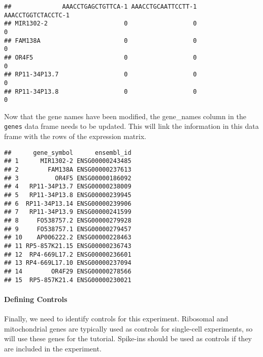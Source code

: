 \documentclass[]{article}
\newenvironment{Shaded}{\begin{snugshade}}{\end{snugshade}}
\newcommand{\DecValTok}[1]{\textcolor[rgb]{0.00,0.00,0.81}{#1}}
\newcommand{\NormalTok}[1]{#1}
\newcommand{\OperatorTok}[1]{\textcolor[rgb]{0.81,0.36,0.00}{\textbf{#1}}}
\newcommand{\StringTok}[1]{\textcolor[rgb]{0.31,0.60,0.02}{#1}}
\let\oldparagraph\paragraph
\renewcommand{\paragraph}[1]{\oldparagraph{#1}\mbox{}}
\begin{document}
\begin{verbatim}
##              AAACCTGAGCTGTTCA-1 AAACCTGCAATTCCTT-1 AAACCTGGTCTACCTC-1
## MIR1302-2                     0                  0                  0
## FAM138A                       0                  0                  0
## OR4F5                         0                  0                  0
## RP11-34P13.7                  0                  0                  0
## RP11-34P13.8                  0                  0                  0
\end{verbatim}

Now that the gene names have been modified, the gene\_names column in
the \texttt{genes} data frame needs to be updated. This will link the
information in this data frame with the rows of the expression matrix.

\begin{Shaded}
\end{Shaded}

\begin{verbatim}
##      gene_symbol      ensembl_id
## 1      MIR1302-2 ENSG00000243485
## 2        FAM138A ENSG00000237613
## 3          OR4F5 ENSG00000186092
## 4   RP11-34P13.7 ENSG00000238009
## 5   RP11-34P13.8 ENSG00000239945
## 6  RP11-34P13.14 ENSG00000239906
## 7   RP11-34P13.9 ENSG00000241599
## 8     FO538757.2 ENSG00000279928
## 9     FO538757.1 ENSG00000279457
## 10    AP006222.2 ENSG00000228463
## 11 RP5-857K21.15 ENSG00000236743
## 12  RP4-669L17.2 ENSG00000236601
## 13 RP4-669L17.10 ENSG00000237094
## 14        OR4F29 ENSG00000278566
## 15  RP5-857K21.4 ENSG00000230021
\end{verbatim}

\hypertarget{defining-controls}{%
\paragraph{Defining Controls}\label{defining-controls}}

Finally, we need to identify controls for this experiment. Ribosomal and
mitochondrial genes are typically used as controls for single-cell
experiments, so will use these genes for the tutorial. Spike-ins should
be used as controls if they are included in the experiment.
\end{document}
